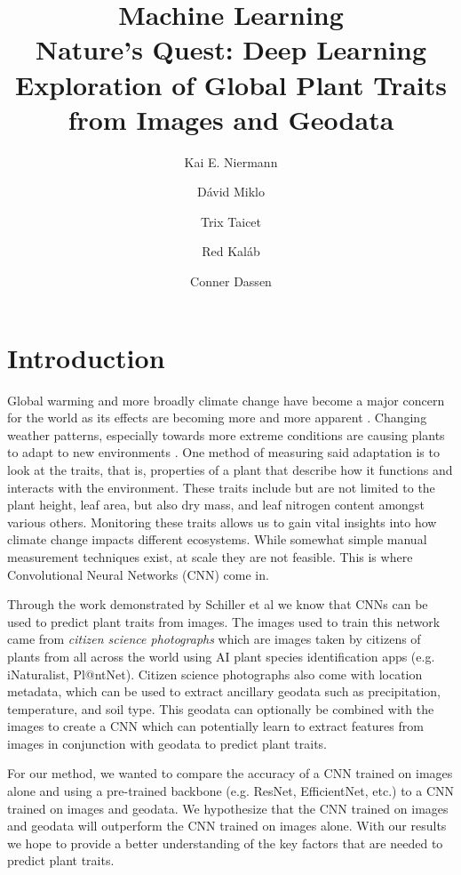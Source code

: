\documentclass[12pt,a4paper,oneside]{article}
\title{
    \Huge{Machine Learning} \\ \LARGE 
    Nature's Quest: Deep Learning Exploration of Global Plant Traits from Images and Geodata
}
\author{
Kai E. Niermann \and
Dávid Miklo \and 
Trix Taicet \and
Red Kaláb \and
Conner Dassen
}
\date{\DTMusedate{date}}
\begin{document}
\maketitle

% 

\begin{abstract}
\end{abstract}

\section{Introduction}
Global warming and more broadly climate change have become a major concern for the world as its effects are becoming more and more apparent \cite{WANG2023100237}. Changing weather patterns, especially towards more extreme conditions are causing plants to adapt to new environments \cite{GRAY201664}. One method of measuring said adaptation is to look at the traits, that is, properties of a plant that describe how it functions and interacts with the environment. These traits include but are not limited to the plant height, leaf area, but also dry mass, and leaf nitrogen content amongst various others. Monitoring these traits allows us to gain vital insights into how climate change impacts different ecosystems. While somewhat simple manual measurement techniques exist, at scale they are not feasible. This is where Convolutional Neural Networks (CNN) come in.  

\smallskip
Through the work demonstrated by Schiller et al \cite{schiller2021deep} we know that CNNs can be used to predict plant traits from images. The images used to train this network came from \textit{citizen science photographs} which are images taken by citizens of plants from all across the world using AI plant species identification apps (e.g. iNaturalist, Pl@ntNet). Citizen science photographs also come with location metadata, which can be used to extract ancillary geodata such as precipitation, temperature, and soil type. This geodata can optionally be combined with the images to create a CNN which can potentially learn to extract features from images in conjunction with geodata to predict plant traits.

\smallskip
For our method, we wanted to compare the accuracy of a CNN trained on images alone and using a pre-trained backbone (e.g. ResNet, EfficientNet, etc.) to a CNN trained on images and geodata. We hypothesize that the CNN trained on images and geodata will outperform the CNN trained on images alone. With our results we hope to provide a better understanding of the key factors that are needed to predict plant traits.
\end{document}
